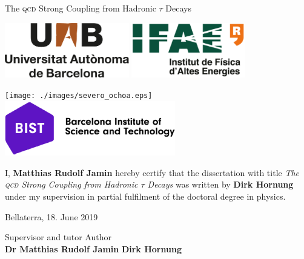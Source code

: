 \documentclass[12pt,a4paper,openright]{scrreprt}
\makeatletter
\numberwithin{equation}{section}       %
\let\org@subfile
\renewcommand*{}[1]{%
  \filename@parse{#1}%
  \expandafter
  \graphicspath\expandafter{\expandafter{\filename@area}}%
  \org@subfile{#1}%
}
\makeatother
\begin{document}
\begin{center}
  \Large The \textsc{qcd} Strong Coupling from Hadronic \(\tau\) Decays

  \makebox[\linewidth]{\rule{\textwidth}{1pt}}

  \vspace{2cm}

  \includegraphics[height=2.4cm]{./images/logo_UAB.eps} \hfill
  \includegraphics[height=2.4cm]{./images/logo_IFAE.eps}

  \vspace{1cm}

  \texttt{[image: ./images/severo\_ochoa.eps]} \hfill
  \includegraphics[height=2.4cm]{./images/bist.eps}

  \vspace{3cm}
\end{center}

\begin{large}
  I, \textbf{Matthias Rudolf Jamin} hereby certify that the dissertation with title
  \textit{The \textsc{qcd} Strong Coupling from Hadronic \(\tau\) Decays} was
  written by \textbf{Dirk Hornung} under my supervision in partial fulfilment
  of the doctoral degree in physics.

  \vfill Bellaterra, 18. June 2019 \par
  \vspace{3cm}
  Supervisor and tutor \hfill Author \hspace{1.75cm} \\
  \textbf{Dr Matthias Rudolf Jamin} \hfill \textbf{Dirk Hornung}
  \vspace{1cm}
\end{large}


  



\setcounter{tocdepth}{1}
\tableofcontents

\newpage
{}





\appendix

\printnomenclature
\printbibliography[heading=bibintoc]
\end{document}
